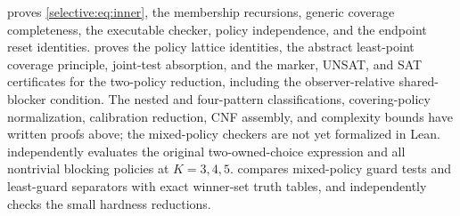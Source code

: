  proves \eqref{selective:eq:inner}, the
membership recursions, generic coverage completeness, the executable
checker, policy independence, and the endpoint reset identities.
 proves the policy lattice identities,
the abstract least-point coverage principle, joint-test absorption,
and the marker, UNSAT,
and SAT certificates for the two-policy reduction, including the
observer-relative shared-blocker condition. The nested and four-pattern
classifications, covering-policy normalization, calibration reduction,
CNF assembly, and complexity bounds have written proofs
above; the mixed-policy checkers are not yet formalized in Lean.
 independently evaluates the original
two-owned-choice expression and all nontrivial blocking policies at
$K=3,4,5$.  compares mixed-policy
guard tests and least-guard separators with exact winner-set truth
tables, and independently checks the small hardness reductions.


